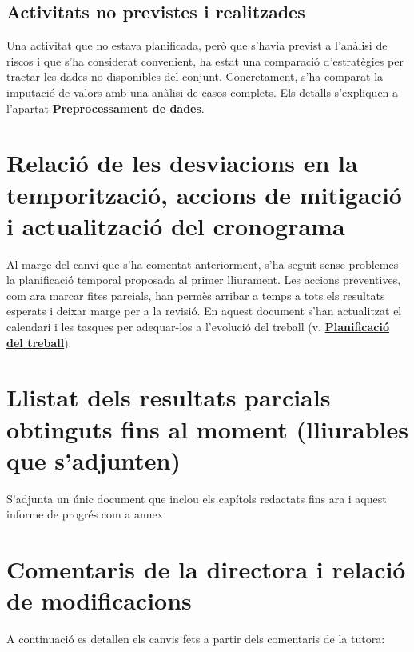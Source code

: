 \documentclass[CAT]{TFUOC}%
\begin{document}
\subsection{Activitats no previstes i realitzades}\label{activitats-no-previstes-i-realitzades-1}

Una activitat que no estava planificada, però que s'havia previst a l'anàlisi de riscos i que s'ha considerat convenient, ha estat una comparació d'estratègies per tractar les dades no disponibles del conjunt. Concretament, s'ha comparat la imputació de valors amb una anàlisi de casos complets. Els detalls s'expliquen a l'apartat \textbf{\hyperref[preprocessament-de-dades]{Preprocessament de dades}}.

\section{Relació de les desviacions en la temporització, accions de mitigació i actualització del cronograma}\label{relaciuxf3-de-les-desviacions-en-la-temporitzaciuxf3-accions-de-mitigaciuxf3-i-actualitzaciuxf3-del-cronograma-1}

Al marge del canvi que s'ha comentat anteriorment, s'ha seguit sense problemes la planificació temporal proposada al primer lliurament. Les accions preventives, com ara marcar fites parcials, han permès arribar a temps a tots els resultats esperats i deixar marge per a la revisió. En aquest document s'han actualitzat el calendari i les tasques per adequar-los a l'evolució del treball (v. \textbf{\hyperref[planificaciuxf3-del-treball]{Planificació del treball}}).

\section{Llistat dels resultats parcials obtinguts fins al moment (lliurables que s'adjunten)}\label{llistat-dels-resultats-parcials-obtinguts-fins-al-moment-lliurables-que-sadjunten-1}

S'adjunta un únic document que inclou els capítols redactats fins ara i aquest informe de progrés com a annex.

\section{Comentaris de la directora i relació de modificacions}\label{comentaris-de-la-directora-i-relaciuxf3-de-modificacions}

A continuació es detallen els canvis fets a partir dels comentaris de la tutora:
\end{document}

